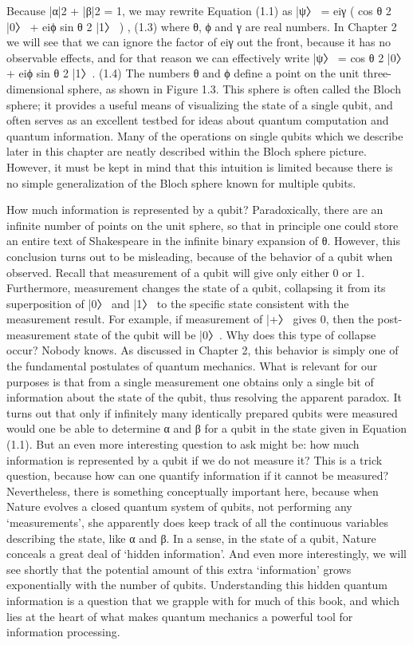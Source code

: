 \documentclass{book}
\begin{document}
Because |α|2 + |β|2 = 1, we may rewrite Equation (1.1) as
|ψ〉 = eiγ
(
cos θ
2 |0〉 + eiϕ sin θ
2 |1〉
)
, (1.3)
where θ, ϕ and γ are real numbers. In Chapter 2 we will see that we can ignore the factor
of eiγ out the front, because it has no observable effects, and for that reason we can
effectively write
|ψ〉 = cos θ
2 |0〉 + eiϕ sin θ
2 |1〉. (1.4)
The numbers θ and ϕ define a point on the unit three-dimensional sphere, as shown in
Figure 1.3. This sphere is often called the Bloch sphere; it provides a useful means of
visualizing the state of a single qubit, and often serves as an excellent testbed for ideas
about quantum computation and quantum information. Many of the operations on single
qubits which we describe later in this chapter are neatly described within the Bloch sphere
picture. However, it must be kept in mind that this intuition is limited because there is
no simple generalization of the Bloch sphere known for multiple qubits.




How much information is represented by a qubit? Paradoxically, there are an infinite
number of points on the unit sphere, so that in principle one could store an entire text
of Shakespeare in the infinite binary expansion of θ. However, this conclusion turns
out to be misleading, because of the behavior of a qubit when observed. Recall that
measurement of a qubit will give only either 0 or 1. Furthermore, measurement changes
the state of a qubit, collapsing it from its superposition of |0〉 and |1〉 to the specific state
consistent with the measurement result. For example, if measurement of |+〉 gives 0,
then the post-measurement state of the qubit will be |0〉. Why does this type of collapse
occur? Nobody knows. As discussed in Chapter 2, this behavior is simply one of the
fundamental postulates of quantum mechanics. What is relevant for our purposes is that
from a single measurement one obtains only a single bit of information about the state of
the qubit, thus resolving the apparent paradox. It turns out that only if infinitely many identically prepared qubits were measured would one be able to determine α and β for
a qubit in the state given in Equation (1.1).
But an even more interesting question to ask might be: how much information is
represented by a qubit if we do not measure it? This is a trick question, because how
can one quantify information if it cannot be measured? Nevertheless, there is something
conceptually important here, because when Nature evolves a closed quantum system of
qubits, not performing any ‘measurements’, she apparently does keep track of all the
continuous variables describing the state, like α and β. In a sense, in the state of a qubit,
Nature conceals a great deal of ‘hidden information’. And even more interestingly, we will
see shortly that the potential amount of this extra ‘information’ grows exponentially with
the number of qubits. Understanding this hidden quantum information is a question
that we grapple with for much of this book, and which lies at the heart of what makes
quantum mechanics a powerful tool for information processing.
\end{document}
